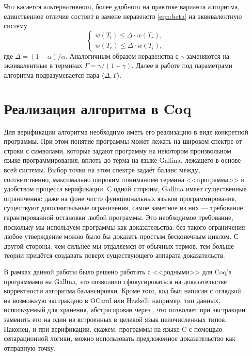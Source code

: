 \documentclass[a4paper,14pt]{extarticle}
\begin{document}
Что касается альтернативного,
более удобного на практике варианта алгоритма,
единственное отличие состоит в замене
неравенств \ref{eqn:beta} на эквивалентную
систему
\begin{equation}
  \begin{cases}
    w(T_l) \leqslant \Delta \cdot w(T_r), \\
    w(T_r) \leqslant \Delta \cdot w(T_l),
  \end{cases}
\end{equation}
где \( \Delta = (1 - \alpha)/\alpha \).
Аналогичным образом неравенства с \( \gamma \)
заменяются на эквивалентные в терминах
\( \Gamma = \gamma/(1 - \gamma) \).
Далее в работе под параметрами алгоритма
подразумевается пара \( \langle \Delta, \Gamma \rangle \).

\clearpage
\section{Реализация алгоритма в Coq}

Для верификации алгоритма необходимо иметь его реализацию в виде конкретной программы. 
При этом понятие программы может лежать на широком спектре от строки с
символами, которые задают программу на некотором произвольном языке
программирования, вплоть до терма на языке Gallina, лежащего в основе всей
системы. Выбор точки на этом спектре задаёт баланс между, соответственно,
максимально широким пониманием термина <<программа>> и удобством процесса
верификации. С одной стороны, Gallina имеет существенные ограничения: даже
на фоне чисто функциональных языков программирования, существуют дополнительные
ограничения, самое заметное из них --- требование гарантированной остановки любой
программы. Это необходимое требование, поскольку мы используем программы как
доказательства: без такого ограничения любое утверждение можно было бы доказать
простым бесконечным циклом. С другой стороны, чем сильнее мы отдаляемся от обычных термов, тем
больше теории придётся создавать поверх существующего аппарата доказательств.

В рамках данной работы было решено работать
с <<родными>> для Coq'а программами на Gallina,
это позволило сфокусироваться на доказательстве
корректности алгоритма балансировки.
Кроме того, код был написан с оглядкой на
возможную экстракцию в OCaml или Haskell;
например, тип данных, используемый для хранения,
абстрагирован через ,
что позволяет при экстракции заменить его
на один из встроенных в целевой язык целочисленных типов.
Наконец, и при верификации, скажем, программы на языке C
с помощью сепарационной логики,
можно использовать предложенное доказательство
как отправную точку.
\end{document}
